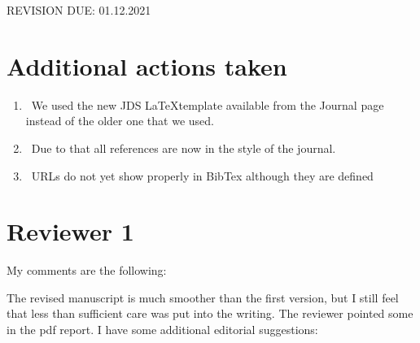 
\newcommand{\DONE}{{\color{green!60!black}\makebox[0pt][l]{$\square$}\raisebox{.15ex}{\hspace{0.1em}$\checkmark$}}~}
\newcommand{\DOIT}{{\color{red!60!black}\makebox[0pt][l]{$\square$}\raisebox{.15ex}{\hspace{0.1em}$\boxtimes$}}~}
\newcommand{\PROGRESS}{(in progress)~}


REVISION DUE: 01.12.2021

\section{Additional actions taken}

\begin{enumerate}

    \item \DONE We used the new JDS \LaTeX template available from the Journal page instead of the older one that we used.
    
    \item \DONE Due to that all references are now in the style of the journal.
    
    \item \DOIT URLs do not yet show properly in BibTex although they are defined

\end{enumerate}


\section*{Reviewer 1}

My comments are the following:

The revised manuscript is much smoother than the first version, but I still feel that less than sufficient care was put into the writing. The reviewer pointed some in the pdf report. I have some additional editorial suggestions:

